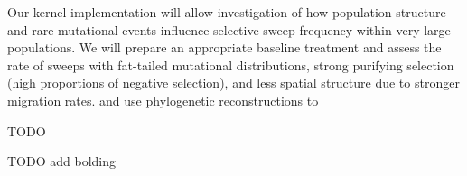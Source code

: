 Our kernel implementation will allow investigation of how population structure and rare mutational events influence selective sweep frequency within very large populations.
We will prepare an appropriate baseline treatment and assess the rate of sweeps with fat-tailed mutational distributions, strong purifying selection (high proportions of negative selection), and less spatial structure due to stronger migration rates.
and use phylogenetic reconstructions to

TODO





TODO add bolding

